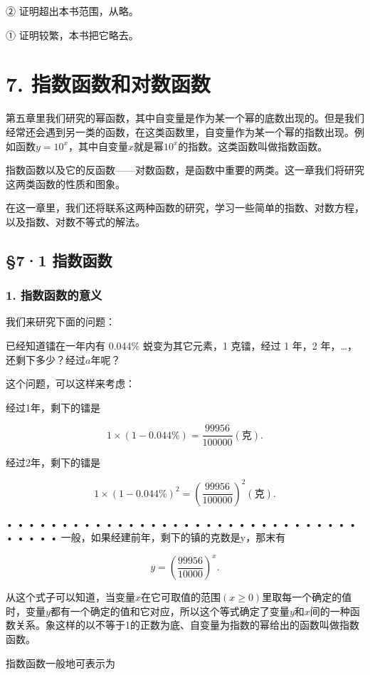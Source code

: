 ② 证明超出本书范围，从略。

① 证明较繁，本书把它略去。

\chapter{7. 指数函数和对数函数}

第五章里我们研究的幂函数，其中自变量是作为某一个幂的底数出现的。但是我们经常还会遇到另一类的函数，在这类函数里，自变量作为某一个幂的指数出现。例如函数\(y=10^x\)，其中自变量\(x\)就是幂\(10^x\)的指数。这类函数叫做指数函数。

指数函数以及它的反函数------对数函数，是函数中重要的两类。这一章我们将研究这两类函数的性质和图象。

在这一章里，我们还将联系这两种函数的研究，学习一些简单的指数、对数方程，以及指数、对数不等式的解法。

\section{§7·1 指数函数}

\subsection{1. 指数函数的意义}

我们来研究下面的问题：

已经知道镭在一年内有 0.044\% 蜕变为其它元素，1 克镭，经过 1 年，2
年，\ldots，还剩下多少？经过\(a\)年呢？

这个问题，可以这样来考虑：

经过1年，剩下的镭是

\[
1 \times (1 - 0.044\%) = \frac{99956}{100000} (\text{克}).
\]

经过2年，剩下的镭是

\[
1 \times (1 - 0.044\%)^{2} = \left(\frac{99956}{100000}\right)^{2} (\text{克}).
\]

• • • • • • • • • • • • • • • • • • • • • • • • • • • • • • • • • • • •
• 一般，如果经建前年，剩下的镇的克数是y，那末有

\[
y = \left(\frac{99956}{10000}\right)^{x}.
\]

从这个式子可以知道，当变量\(x\)在它可取值的范围\((x \geqslant 0)\)里取每一个确定的值时，变量\(y\)都有一个确定的值和它对应，所以这个等式确定了变量\(y\)和\(x\)间的一种函数关系。象这样的以不等于1的正数为底、自变量为指数的幂给出的函数叫做指数函数。

指数函数一般地可表示为

